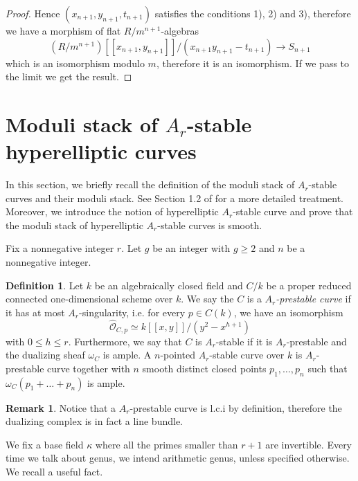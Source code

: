 \documentclass{alggeom}
\numberwithin{equation}{section}
\numberwithin{subsection}{section}
\theoremstyle{definition}
\newtheorem{definition}[theorem]{Definition}
\newtheorem{remark}[theorem]{Remark}
\theoremstyle{remark}
\newcommand\cO{\mathcal{O}} \newcommand\cP{\mathcal{P}}
\begin{document}
\begin{proof}
Hence $(x_{n+1},y_{n+1},t_{n+1})$ satisfies the conditions 1), 2) and 3),
therefore we have a morphism of flat $R/m^{n+1}$-algebras
$$ (R/m^{n+1})[[x_{n+1},y_{n+1}]]/(x_{n+1}y_{n+1}-t_{n+1}) \longrightarrow S_{n+1}$$ 
which is an isomorphism modulo $m$, therefore it is an isomorphism. If we pass to the limit we get the result.
 \end{proof}



 


\section{Moduli stack of $A_r$-stable hyperelliptic curves}\label{sec:2}

In this section, we briefly recall the definition of the moduli stack of $A_r$-stable curves and their moduli stack. See Section 1.2 of \cite{PerTesi} for a more detailed treatment. Moreover, we introduce the notion of hyperelliptic $A_r$-stable curve and prove that the moduli stack of hyperelliptic $A_r$-stable curves is smooth.


Fix a nonnegative integer $r$. Let $g$ be an integer with $g\geq 2$ and $n$ be a nonnegative integer.
\begin{definition}	Let $k$ be an algebraically closed field and $C/k$ be a proper reduced connected one-dimensional scheme over $k$. We say the $C$ is a \emph{$A_r$-prestable curve} if it has at most $A_r$-singularity, i.e. for every $p\in C(k)$, we have an isomorphism
		$$ \widehat{\cO}_{C,p} \simeq k[[x,y]]/(y^2-x^{h+1}) $$ 
	with $ 0\leq h\leq r$. Furthermore, we say that $C$ is $A_r$-stable if it is $A_r$-prestable and the dualizing sheaf $\omega_C$ is ample. A $n$-pointed $A_r$-stable curve over $k$ is $A_r$-prestable curve together with $n$ smooth distinct closed points $p_1,\dots,p_n$ such that $\omega_C(p_1+\dots+p_n)$ is ample.
\end{definition}
\begin{remark}
	Notice that a $A_r$-prestable curve is l.c.i by definition, therefore the dualizing complex is in fact a line bundle. 
\end{remark}

We fix a base field $\kappa$ where all the primes smaller than $r+1$ are invertible. Every time we talk about genus, we intend arithmetic genus, unless specified otherwise. We recall a useful fact.
\end{document}
